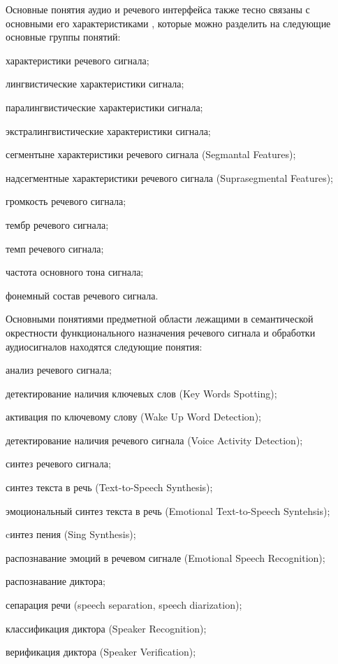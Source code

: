 Основные понятия аудио и речевого интерфейса также тесно связаны с основными его характеристиками \textit{}, которые можно разделить на следующие основные группы понятий:
\begin{textitemize}
    \item характеристики речевого сигнала;
    \item лингвистические характеристики сигнала;
    \item паралингвистические характеристики сигнала;
    \item экстралингвистические характеристики сигнала;
    \item сегментыне характеристики речевого сигнала (Segmantal Features);
    \item надсегментные характеристики речевого сигнала (Suprasegmental Features);
    \item громкость речевого сигнала;
    \item тембр речевого сигнала;
    \item темп речевого сигнала;
    \item частота основного тона сигнала;
    \item фонемный состав речевого сигнала.
\end{textitemize}


Основными понятиями предметной области лежащими в семантической окрестности функционального назначения речевого сигнала  и обработки аудиосигналов  находятся следующие понятия:
\begin{textitemize}    
    \item анализ речевого сигнала;
    \item детектирование наличия ключевых слов (Key Words Spotting);
    \item активация по ключевому слову (Wake Up Word Detection);
    \item детектирование наличия речевого сигнала (Voice Activity Detection);
    \item синтез речевого сигнала;
    \item синтез текста в речь (Text-to-Speech Synthesis);
    \item эмоциональный синтез текста в речь (Emotional Text-to-Speech Syntehsis);
    \item cинтез пения (Sing Synthesis);
    \item распознавание эмоций в речевом сигнале (Emotional Speech Recognition);
    \item распознавание диктора;
    \item сепарация речи (speech separation, speech diarization);
    \item классификация диктора (Speaker Recognition);
    \item верификация диктора (Speaker Verification);
\end{textitemize}

